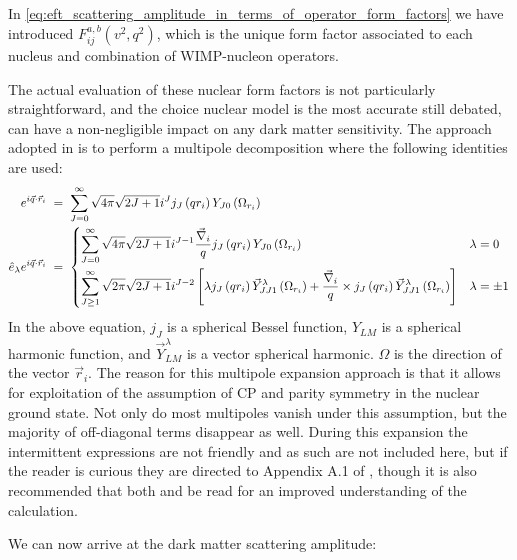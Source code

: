In \autoref{eq:eft_scattering_amplitude_in_terms_of_operator_form_factors} we have introduced $F_{ij}^{a,b}(v^2,q^2)$, which is the unique form factor associated to each nucleus and combination of WIMP-nucleon operators.
\par
The actual evaluation of these nuclear form factors is not particularly straightforward, and the choice nuclear model is the most accurate still debated, can have a non-negligible impact on any dark matter sensitivity.
The approach adopted in \cite{Fitzpatrick_2013_ref} is to perform a multipole decomposition where the following identities are used:
\begin{equation}
\begin{split}
e^{i \vec{q} \cdot \vec{r}_i}\;&=\;\sum_{J=0}^{\infty} \sqrt{4 \pi} \sqrt{2 J+1} i^J j_J\left(q r_i\right) Y_{J 0}\left(\Omega_{r_i}\right) \\
\hat{e}_\lambda e^{i \vec{q} \cdot \vec{r}_i} \; &= \; 
\begin{dcases}
\sum_{J=0}^{\infty} \sqrt{4 \pi} \sqrt{2 J+1} i^{J-1} \frac{\vec{\nabla}_i}{q} j_J\left(q r_i\right) Y_{J 0}\left(\Omega_{r_i}\right) & \lambda=0 \\
\sum_{J \geq 1}^{\infty} \sqrt{2 \pi} \sqrt{2 J+1} i^{J-2}\left[\lambda j_J\left(q r_i\right) \vec{Y}_{J J 1}^\lambda\left(\Omega_{r_i}\right)+\frac{\vec{\nabla}_i}{q} \times j_J\left(q r_i\right) \vec{Y}_{J J 1}^\lambda\left(\Omega_{r_i}\right)\right] & \lambda=\pm 1
\end{dcases}
\end{split}
\label{eq:eft_multipole_expansion}
\end{equation}
In the above equation, $j_J$ is a spherical Bessel function, $Y_{LM}$ is a spherical harmonic function, and $\vec{Y}^{\lambda}_{LM}$ is a vector spherical harmonic.
$\Omega$ is the direction of the vector $\vec{r}_i$.
The reason for this multipole expansion approach is that it allows for exploitation of the assumption of CP and parity symmetry in the nuclear ground state.
Not only do most multipoles vanish under this assumption, but the majority of off-diagonal terms disappear as well.
During this expansion the intermittent expressions are not friendly and as such are not included here, but if the reader is curious they are directed to Appendix A.1 of \cite{Fitzpatrick_2013_ref}, though it is also recommended that both \cite{weak_multipole_expansion_ref} and \cite{semileptonic_multipole_expansion_ref} be read for an improved understanding of the calculation.
\par
We can now arrive at the dark matter scattering amplitude:
